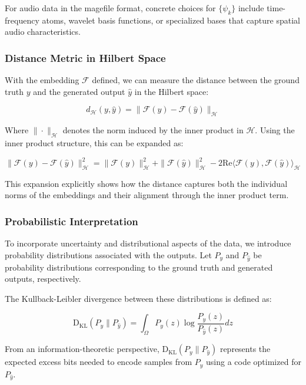 For audio data in the magefile format, concrete choices for $\{\psi_k\}$ include time-frequency atoms, wavelet basis functions, or specialized bases that capture spatial audio characteristics.

\subsubsection{Distance Metric in Hilbert Space}

With the embedding $\mathcal{F}$ defined, we can measure the distance between the ground truth $y$ and the generated output $\hat{y}$ in the Hilbert space:

\begin{equation}
d_{\mathcal{H}}(y, \hat{y}) = \|\mathcal{F}(y) - \mathcal{F}(\hat{y})\|_{\mathcal{H}}
\end{equation}

Where $\|\cdot\|_{\mathcal{H}}$ denotes the norm induced by the inner product in $\mathcal{H}$. Using the inner product structure, this can be expanded as:

\begin{equation}
\|\mathcal{F}(y) - \mathcal{F}(\hat{y})\|_{\mathcal{H}}^2 = \|\mathcal{F}(y)\|_{\mathcal{H}}^2 + \|\mathcal{F}(\hat{y})\|_{\mathcal{H}}^2 - 2\text{Re}\langle \mathcal{F}(y), \mathcal{F}(\hat{y}) \rangle_{\mathcal{H}}
\end{equation}

This expansion explicitly shows how the distance captures both the individual norms of the embeddings and their alignment through the inner product term.

\subsubsection{Probabilistic Interpretation}

To incorporate uncertainty and distributional aspects of the data, we introduce probability distributions associated with the outputs. Let $P_y$ and $P_{\hat{y}}$ be probability distributions corresponding to the ground truth and generated outputs, respectively.

The Kullback-Leibler divergence between these distributions is defined as:

\begin{equation}
\mathrm{D_{KL}}(P_y \| P_{\hat{y}}) = \int_{\Omega} P_y(z) \log\frac{P_y(z)}{P_{\hat{y}}(z)} dz
\end{equation}

From an information-theoretic perspective, $\mathrm{D_{KL}}(P_y \| P_{\hat{y}})$ represents the expected excess bits needed to encode samples from $P_y$ using a code optimized for $P_{\hat{y}}$.

